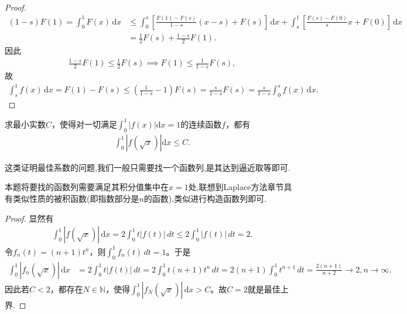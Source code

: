 \documentclass[../../main.tex]{subfiles}
\begin{document}
\begin{proof}
\begin{align*}
(1 - s) F(1) = \int_0^1 F(x) \, \mathrm{d}x &\leq \int_0^s \left[ \frac{F(1) - F(s)}{1 - s}(x - s) + F(s) \right] \, \mathrm{d}x + \int_s^1 \left[ \frac{F(s) - F(0)}{s}x + F(0) \right] \, \mathrm{d}x \\
&= \frac{1}{2} F(s) + \frac{1 - s}{2} F(1).
\end{align*}
因此
\begin{align*}
\frac{1 - s}{2} F(1) \leq \frac{1}{2} F(s) \implies F(1) \leq \frac{1}{1 - s} F(s),
\end{align*}
故
\begin{align*}
\int_s^1 f(x) \, \mathrm{d}x = F(1) - F(s) \leq \left( \frac{1}{1 - s} - 1 \right) F(s) = \frac{s}{1 - s} F(s) = \frac{s}{1 - s} \int_0^s f(x) \, \mathrm{d}x.
\end{align*}
\end{proof}

\begin{example}
求最小实数$C$，使得对一切满足$\int_{0}^{1}|f(x)|\mathrm{d}x = 1$的连续函数$f$，都有
\begin{align*}
\int_{0}^{1}|f(\sqrt{x})|\mathrm{d}x \leqslant C.
\end{align*}
\end{example}
\begin{remark}
这类证明最佳系数的问题,我们一般只需要找一个函数列,是其达到逼近取等即可.

本题将要找的函数列需要满足其积分值集中在$x=1$处,联想到Laplace方法章节具有类似性质的被积函数(即指数部分是$n$的函数),类似进行构造函数列即可.
\end{remark}
\begin{proof}
显然有
\begin{align*}
\int_0^1 |f(\sqrt{x})| \, \mathrm{d}x = 2 \int_0^1 t |f(t)| \, dt \leqslant 2 \int_0^1 |f(t)| \, dt = 2.
\end{align*}
令$f_n(t) = (n+1) t^n$，则$\int_0^1 f_n(t) \, dt = 1$。于是
\begin{align*}
\int_0^1 |f_n(\sqrt{x})| \, \mathrm{d}x &= 2 \int_0^1 t |f(t)| \, dt = 2 \int_0^1 t (n+1) t^n \, dt 
= 2 (n+1) \int_0^1 t^{n+1} \, dt = \frac{2(n+1)}{n+2} \to 2, n \to \infty.
\end{align*}
因此若$C < 2$，都存在$N \in \mathbb{N}$，使得$\int_0^1 |f_N(\sqrt{x})| \, \mathrm{d}x > C$。故$C = 2$就是最佳上界.
\end{proof}
\end{document}
